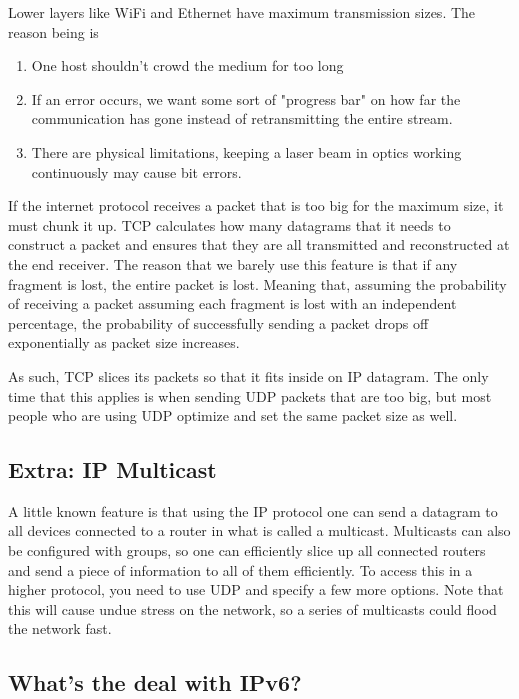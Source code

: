 Lower layers like WiFi and Ethernet have maximum transmission sizes.
The reason being is

\begin{enumerate}
  \item One host shouldn't crowd the medium for too long
  \item If an error occurs, we want some sort of "progress bar" on how far the communication has gone instead of retransmitting the entire stream.
  \item There are physical limitations, keeping a laser beam in optics working continuously may cause bit errors.
\end{enumerate}

If the internet protocol receives a packet that is too big for the maximum size, it must chunk it up.
TCP calculates how many datagrams that it needs to construct a packet and ensures that they are all transmitted and reconstructed at the end receiver.
The reason that we barely use this feature is that if any fragment is lost, the entire packet is lost.
Meaning that, assuming the probability of receiving a packet assuming each fragment is lost with an independent percentage, the probability of successfully sending a packet drops off exponentially as packet size increases.

As such, TCP slices its packets so that it fits inside on IP datagram.
The only time that this applies is when sending UDP packets that are too big, but most people who are using UDP optimize and set the same packet size as well.

\subsection{Extra: IP Multicast}

A little known feature is that using the IP protocol one can send a datagram to all devices connected to a router in what is called a multicast.
Multicasts can also be configured with groups, so one can efficiently slice up all connected routers and send a piece of information to all of them efficiently.
To access this in a higher protocol, you need to use UDP and specify a few more options.
Note that this will cause undue stress on the network, so a series of multicasts could flood the network fast.

\subsection{What's the deal with IPv6?}

